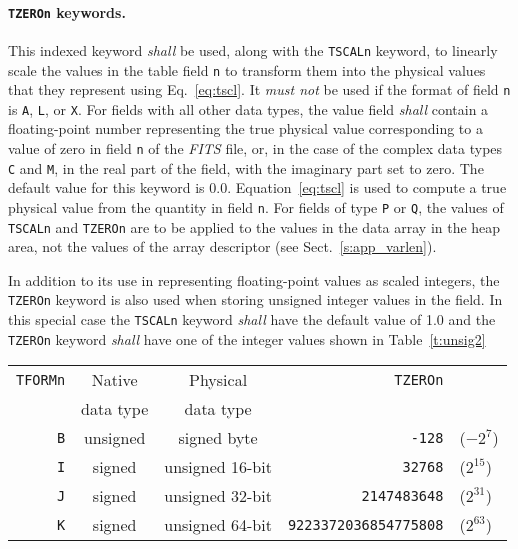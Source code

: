 \documentclass[onecolumn]{aa}
\begin{document}
    \paragraph{{\tt TZEROn} keywords.}
 This indexed keyword {\em shall} be used, along with the {\tt TSCALn}
 keyword, to linearly scale the values in the table field {\tt n}
 to transform them
 into the physical  values that they
 represent using Eq.~\ref{eq:tscl}. It {\em must not} be used 
 if the format of field 
 {\tt n} is {\tt A}, {\tt L}, or {\tt X}.  
 For fields with all other data types, 
 the value field {\em shall} contain a floating-point number
 representing the true physical value corresponding to a value of 
 zero in field {\tt n} of the {\em FITS\/} file, or, in the case of the complex 
 data types {\tt C} and {\tt M}, in the real part of the field, 
 with the imaginary part set
 to zero.  The default value for this keyword is 0.0.
 Equation~\ref{eq:tscl} is used to compute a true
 physical value from the quantity in field {\tt n}.
  For fields  of type {\tt P} or {\tt Q},
the values of {\tt TSCALn} and {\tt TZEROn}
are to be applied to the values in the
data array in the heap  area, not the values of the array descriptor
(see Sect.\ \ref{s:app_varlen}).

 In addition to its use in representing floating-point values as scaled
 integers, 
 the {\tt TZEROn} keyword is also used when storing unsigned integer
 values in the field. In this special case the {\tt TSCALn} keyword {\em shall}
 have the default value of 1.0 and the {\tt TZEROn} keyword
 {\em shall} have one of the integer values shown in Table~\ref{t:unsig2}


\begin{table*}
\centering
\caption{Usage of {\tt TZEROn} to represent non-default integer data types.}
\label{t:unsig2}
\begin{tabular}{rccrl} 
\hline \hline
{\tt TFORMn} & {Native } & {Physical} & {\tt TZEROn} &   \\
 &  data type & {data type} &  &   \\
\hline
 {\tt B}          & unsigned & signed byte     & {\tt -128}  &       ($-2^{7}$)      \\
 {\tt I}          & signed   & unsigned 16-bit & {\tt 32768} & ($2^{15}$) \\
 {\tt J}          & signed   & unsigned 32-bit & {\tt 2147483648} & ($2^{31}$) \\
 {\tt K}          & signed   & unsigned 64-bit & {\tt 9223372036854775808} & ($2^{63}$) \\
\hline
\end{tabular}
\end{table*}
\end{document}
